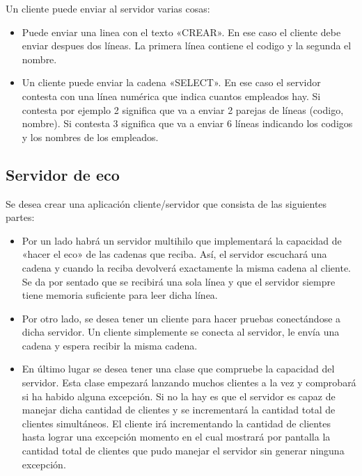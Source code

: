 \documentclass[letterpaper,10pt,spanish]{sphinxmanual}
\begin{document}
Un cliente puede enviar al servidor varias cosas:
\begin{itemize}
\item {} 
Puede enviar una linea con el texto «CREAR». En ese caso el cliente debe enviar despues dos líneas.  La primera línea contiene el codigo y la segunda el nombre.

\item {} 
Un cliente puede enviar la cadena «SELECT». En ese caso el servidor contesta con una línea numérica que indica cuantos empleados hay. Si contesta por ejemplo 2 significa que va a enviar 2 parejas de líneas (codigo, nombre). Si contesta 3 significa que va a enviar 6 líneas indicando los codigos y los nombres de los empleados.

\end{itemize}


\subsection{Servidor de eco}
\label{\detokenize{textos/tema3:servidor-de-eco}}
Se desea crear una aplicación cliente/servidor que consista de las siguientes
partes:
\begin{itemize}
\item {} 
Por un lado habrá un servidor multihilo que implementará la capacidad de «hacer el eco» de las cadenas que reciba. Así, el servidor escuchará una cadena y cuando la reciba devolverá exactamente la misma cadena al cliente. Se da por sentado que se recibirá una sola línea y que el servidor siempre tiene memoria suficiente para leer dicha línea.

\item {} 
Por otro lado, se desea tener un cliente para hacer pruebas conectándose a  dicha servidor. Un cliente simplemente se conecta al servidor, le envía una cadena y espera recibir la misma cadena.

\item {} 
En último lugar se desea tener una clase que compruebe la capacidad del servidor. Esta clase empezará lanzando muchos clientes a la vez y comprobará si ha habido alguna excepción. Si no la hay es que el servidor es capaz de manejar dicha cantidad de clientes y se incrementará la cantidad total de clientes simultáneos. El cliente irá incrementando la cantidad de clientes hasta lograr una excepción momento en el cual mostrará por pantalla la cantidad total de clientes que pudo manejar el servidor sin generar ninguna excepción.

\end{itemize}
\end{document}
